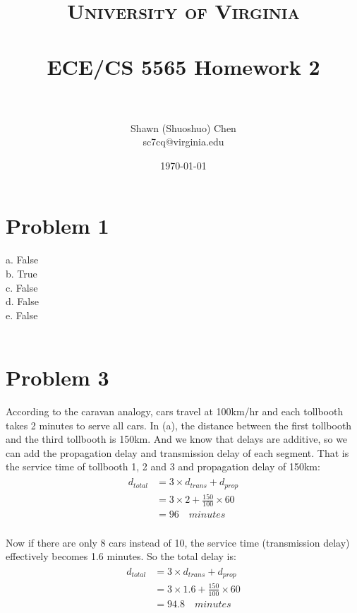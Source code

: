 \documentclass[titlepage, paper=a4, fontsize=11pt]{scrartcl} %
\title{	
\normalfont \normalsize 
\textsc{University of Virginia} \\ [25pt] %
\horrule{0.5pt} \\[0.4cm] %
\huge ECE/CS 5565 Homework 2 \\ %
\horrule{2pt} \\[0.5cm] %
}
\author{Shawn (Shuoshuo) Chen\\sc7cq@virginia.edu} %
\date{\normalsize\today} %
\numberwithin{equation}{section} %
\numberwithin{figure}{section} %
\numberwithin{table}{section} %
\begin{document}
\maketitle %


\section*{Problem 1}

a. False \\
b. True \\
c. False \\
d. False \\
e. False \\
\\



\section*{Problem 3}
According to the caravan analogy, cars travel at 100km/hr and each tollbooth takes 2 minutes to serve all cars.
In (a), the distance between the first tollbooth and the third tollbooth is 150km. And we know that delays are
additive, so we can add the propagation delay and transmission delay of each segment. That is the service time of
tollbooth 1, 2 and 3 and propagation delay of 150km:
\begin{align*} 
\begin{split}
d_{total} &= 3 \times d_{trans} + d_{prop} \\
&= 3 \times 2 + \frac{150}{100} \times 60 \\
&= 96 \quad minutes
\end{split}					
\end{align*}
\\
Now if there are only 8 cars instead of 10, the service time (transmission delay) effectively becomes 1.6 minutes.
So the total delay is:
\begin{align*} 
\begin{split}
d_{total} &= 3 \times d_{trans} + d_{prop} \\
&= 3 \times 1.6 + \frac{150}{100} \times 60 \\
&= 94.8 \quad minutes
\end{split}					
\end{align*}
\\
\end{document}
